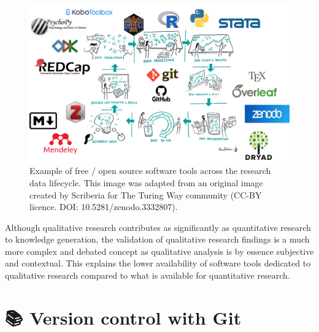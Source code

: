 \documentclass[
  letterpaper,
  DIV=11,
  numbers=noendperiod]{scrreprt}
\begin{document}
\begin{figure}

{\centering \includegraphics{./images/paste-AF117E41.png}

}

\caption{\label{fig-software-tools-across-research-lifecycle}Example of
free / open source software tools across the research data lifecycle.
This image was adapted from an original image created by Scriberia for
The Turing Way community (CC-BY licence. DOI: 10.5281/zenodo.3332807).}

\end{figure}

\begin{tcolorbox}[enhanced jigsaw, colframe=quarto-callout-note-color-frame, colback=white, rightrule=.15mm, bottomrule=.15mm, left=2mm, arc=.35mm, coltitle=black, title=\textcolor{quarto-callout-note-color}{\faInfo}\hspace{0.5em}{Note}, opacitybacktitle=0.6, bottomtitle=1mm, opacityback=0, toptitle=1mm, toprule=.15mm, colbacktitle=quarto-callout-note-color!10!white, titlerule=0mm, leftrule=.75mm, breakable]
Although qualitative research contributes as significantly as
quantitative research to knowledge generation, the validation of
qualitative research findings is a much more complex and debated concept
as qualitative analysis is by essence subjective and contextual. This
explains the lower availability of software tools dedicated to
qualitative research compared to what is available for quantitative
research.
\end{tcolorbox}

\hypertarget{version-control-with-git}{%
\chapter{\texorpdfstring{{📚} Version control with
Git}{📚 Version control with Git}}\label{version-control-with-git}}
\end{document}
